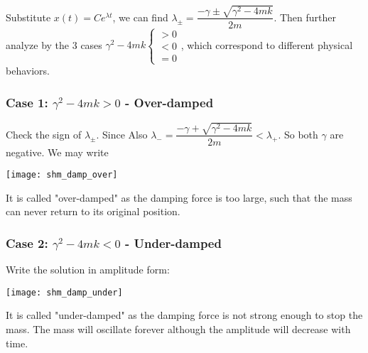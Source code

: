 \documentclass[class=article, crop=false, 12pt]{standalone}
\begin{document}
Substitute $x(t) = Ce^{\lambda t}$, we can find $\lambda_\pm = \dfrac{-\gamma \pm \sqrt{\gamma^2-4mk}}{2m}$.
Then further analyze by the 3 cases 
$\gamma^2-4mk
\begin{cases}
    >0 \\ <0 \\ =0
\end{cases}
$,
which correspond to different physical behaviors.


\subsubsection{Case 1: $\gamma^2-4mk>0$ - Over-damped}

Check the sign of $\lambda_\pm$. Since
Also $\lambda_- = \dfrac{-\gamma + \sqrt{\gamma^2-4mk}}{2m} <\lambda_+$. 
So both $\gamma$ are negative. We may write

\begin{center}
    \texttt{[image: shm\_damp\_over]}
\end{center}

It is called "over-damped" as the damping force is too large, 
such that the mass can never return to its original position.


\subsubsection{Case 2: $\gamma^2-4mk<0$ - Under-damped}

Write the solution in amplitude form:

\begin{center}
    \texttt{[image: shm\_damp\_under]}
\end{center}

It is called "under-damped" as the damping force is not strong enough to stop the mass.
The mass will oscillate forever although the amplitude will decrease with time.
\end{document}

